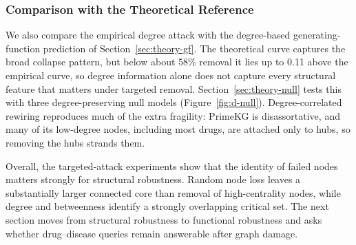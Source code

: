 \subsubsection{Comparison with the Theoretical Reference}
We also compare the empirical degree attack with the degree-based generating-function prediction of Section~\ref{sec:theory-gf}. The theoretical curve captures the broad collapse pattern, but below about 58\% removal it lies up to 0.11 above the empirical curve, so degree information alone does not capture every structural feature that matters under targeted removal. Section~\ref{sec:theory-null} tests this with three degree-preserving null models (Figure~\ref{fig:d-null}). Degree-correlated rewiring reproduces much of the extra fragility: PrimeKG is disassortative, and many of its low-degree nodes, including most drugs, are attached only to hubs, so removing the hubs strands them.

Overall, the targeted-attack experiments show that the identity of failed nodes matters strongly for structural robustness. Random node loss leaves a substantially larger connected core than removal of high-centrality nodes, while degree and betweenness identify a strongly overlapping critical set. The next section moves from structural robustness to functional robustness and asks whether drug--disease queries remain answerable after graph damage.
